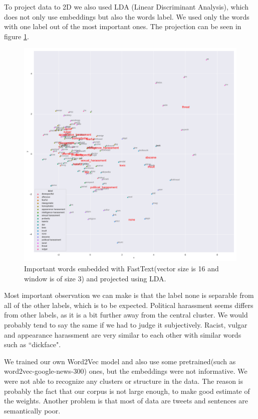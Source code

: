 \documentclass[fleqn,moreauthors,10pt]{ds_report}
\begin{document}
To project data to 2D we also used LDA (Linear Discriminant Analysis), which does not only use embeddings but also the words label. We used only the words with one label out of the most important ones. The projection can be seen in figure \ref{fig:fasttext_LDA}.
\begin{figure}
    \centering
    \includegraphics[width=\columnwidth]{fig/LDA-fasttext.png}%
    \caption{Important words embedded with FastText(vector size is 16 and window is of size 3) and projected using LDA.}
    \label{fig:fasttext_LDA}
\end{figure}
Most important observation we can make is that the label none is separable from all of the other labels, which is to be expected. Political harassment seems differs from other labels, as it is a bit further away from the central cluster. We would probably tend to say the same if we had to judge it subjectively. Racist, vulgar and appearance harassment are very similar to each other with similar words such as ``dickface".

We trained our own Word2Vec model and also use some pretrained(such as word2vec-google-news-300) ones, but the embeddings were not informative. We were not able to recognize any clusters or structure in the data. The reason is probably the fact that our corpus is not large enough, to make good estimate of the weights. Another problem is that most of data are tweets and sentences are semantically poor. 
\end{document}
